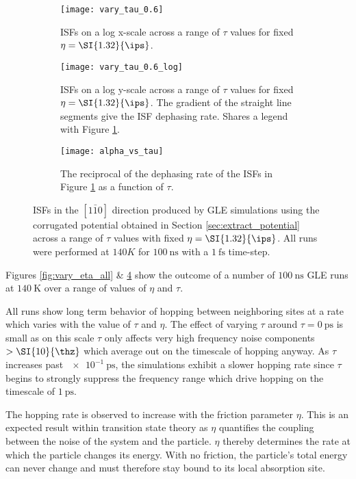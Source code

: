 \begin{figure}
	\begin{subfigure}{1.0\textwidth}
		\texttt{[image: vary\_tau\_0.6]}
		\caption{ISFs on a log x-scale across a range of $\tau$ values for fixed $\eta=\SI{1.32}{\ips}$.}
		\label{fig:vary_tau_0.6}
	\end{subfigure}

	\begin{subfigure}{0.49\textwidth}
		\texttt{[image: vary\_tau\_0.6\_log]}
		\caption{ISFs on a log y-scale across a range of $\tau$ values for fixed $\eta=\SI{1.32}{\ips}$. The gradient of the straight line segments give the ISF dephasing rate. Shares a legend with Figure \ref{fig:vary_tau_0.6}.}
		\label{fig:vary_tau_0.6_log}
	\end{subfigure}
	\hfill	
	\begin{subfigure}{0.49\textwidth}
		\texttt{[image: alpha\_vs\_tau]}
		\caption{The reciprocal of the dephasing rate of the ISFs in Figure \ref{fig:vary_tau_0.6} as a function of $\tau$.}
		\label{fig:alpha_vs_tau}
	\end{subfigure}
	\caption{ISFs in the $\left[1\bar{1}0\right]$ direction produced by GLE simulations using the corrugated potential obtained in Section \ref{sec:extract_potential} across a range of $\tau$ values with fixed $\eta=\SI{1.32}{\ips}$. All runs were performed at $140K$ for $\SI{100}{\ns}$ with a $\SI{1}{\fs}$ time-step.}
	\label{fig:vary_tau_all}
\end{figure}

Figures \ref{fig:vary_eta_all} \& \ref{fig:vary_tau_all} show the outcome of a number of $\SI{100}{\ns}$ GLE runs at $\SI{140}{\kelvin}$ over a range of values of $\eta$ and $\tau$.  

All runs show long term behavior of hopping between neighboring sites at a rate which varies with the value of $\tau$ and $\eta$. The effect of varying $\tau$ around $\tau=\SI{0}{\ps}$ is small as on this scale $\tau$ only affects very high frequency noise components $>\SI{10}{\thz}$ which average out on the timescale of hopping anyway. As $\tau$ increases past $\SI{e-1}{\ps}$, the simulations exhibit a slower hopping rate since $\tau$ begins to strongly suppress the frequency range which drive hopping on the timescale of $\SI{1}{\ps}$.

The hopping rate is observed to increase with the friction parameter $\eta$. This is an expected result within transition state theory \cite{BLIGAARD2008255} as $\eta$ quantifies the coupling between the noise of the system and the particle. $\eta$ thereby determines the rate at which the particle changes its energy. With no friction, the particle's total energy can never change and must therefore stay bound to its local absorption site. 

